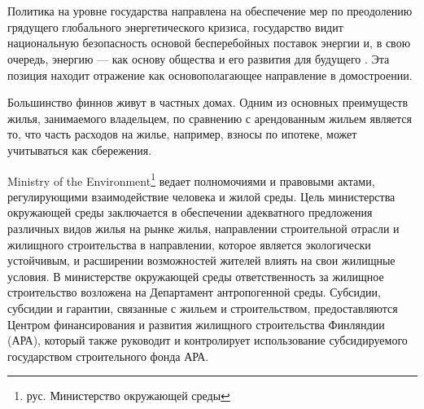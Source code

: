 \section{}





\subsection{\scAssesmentBuildingLaw}
% 
Политика на уровне государства направлена на обеспечение мер по преодолению грядущего глобального энергетического кризиса,
государство видит национальную безопасность основой бесперебойных поставок энергии и, в свою очередь, энергию ---
как основу общества и его развития для будущего \cite{law_FIN_govMinEnvSecurity}. Эта позиция находит отражение как основополагающее направление в домостроении.

Большинство финнов живут в частных домах. Одним из основных преимуществ жилья, занимаемого владельцем, по сравнению с арендованным жильем является то,
что часть расходов на жилье, например, взносы по ипотеке, может учитываться как сбережения.

Ministry of the Environment\footnote{рус. Министерство окружающей среды} ведает полномочиями и правовыми актами,
регулирующими взаимодействие человека и жилой среды. Цель министерства окружающей среды заключается в обеспечении адекватного предложения различных видов жилья на рынке жилья,
направлении строительной отрасли и жилищного строительства в направлении, которое является экологически устойчивым, и расширении возможностей жителей влиять на свои жилищные условия.
В министерстве окружающей среды ответственность за жилищное строительство возложена на Департамент антропогенной среды.
Субсидии, субсидии и гарантии, связанные с жильем и строительством, предоставляются Центром финансирования и развития жилищного строительства Финляндии (АРА),
который также руководит и контролирует использование субсидируемого государством строительного фонда АРА.

